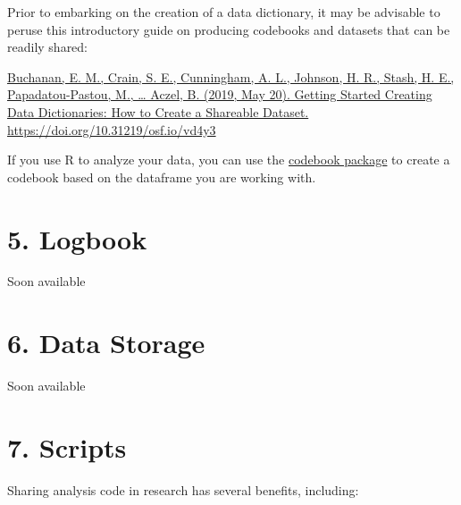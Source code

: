 \documentclass[
  letterpaper,
  DIV=11,
  numbers=noendperiod]{scrreprt}
\begin{document}
Prior to embarking on the creation of a data dictionary, it may be
advisable to peruse this introductory guide on producing codebooks and
datasets that can be readily shared:

\href{https://osf.io/vd4y3/}{Buchanan, E. M., Crain, S. E., Cunningham,
A. L., Johnson, H. R., Stash, H. E., Papadatou-Pastou, M., \ldots{}
Aczel, B. (2019, May 20). Getting Started Creating Data Dictionaries:
How to Create a Shareable Dataset.
https://doi.org/10.31219/osf.io/vd4y3}

If you use R to analyze your data, you can use the
\href{https://rubenarslan.github.io/codebook/index.html}{codebook
package} to create a codebook based on the dataframe you are working
with.


\hypertarget{logbook-1}{%
\chapter*{5. Logbook}\label{logbook-1}}


Soon available


\hypertarget{data-storage-1}{%
\chapter*{6. Data Storage}\label{data-storage-1}}


Soon available


\hypertarget{scripts-1}{%
\chapter*{7. Scripts}\label{scripts-1}}


Sharing analysis code in research has several benefits, including:
\end{document}
